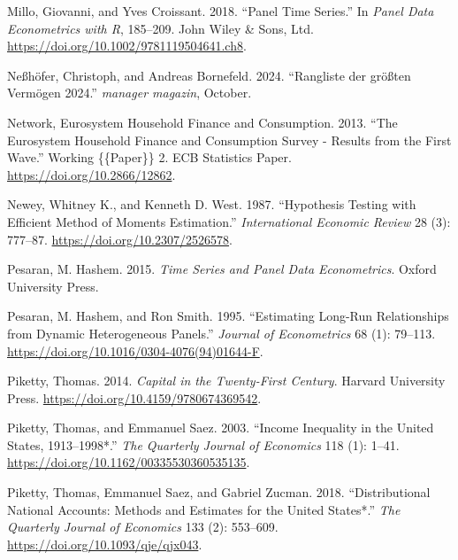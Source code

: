 \documentclass[
  a4paper,
  DIV=11,
  numbers=noendperiod]{scrartcl}
\newlength{\cslhangindent}
\newenvironment{CSLReferences}[2] %
 {\begin{list}{}{%
  \setlength{\itemindent}{0pt}
  \setlength{\leftmargin}{0pt}
  \setlength{\parsep}{0pt}
  \ifodd #1
   \setlength{\leftmargin}{\cslhangindent}
   \setlength{\itemindent}{-1\cslhangindent}
  \fi
  \setlength{\itemsep}{#2\baselineskip}}}
 {\end{list}}
\begin{document}
\begin{CSLReferences}{1}{0}
Millo, Giovanni, and Yves Croissant. 2018. {``Panel {Time Series}.''} In
\emph{Panel {Data Econometrics} with {R}}, 185--209. John Wiley \& Sons,
Ltd. \url{https://doi.org/10.1002/9781119504641.ch8}.

Neßhöfer, Christoph, and Andreas Bornefeld. 2024. {``{Rangliste der
gr{ö}{ß}ten Verm{ö}gen 2024}.''} \emph{manager magazin}, October.

Network, Eurosystem Household Finance and Consumption. 2013. {``The
{Eurosystem Household Finance} and {Consumption Survey} - {Results} from
the First Wave.''} Working \{\{Paper\}\} 2. ECB Statistics Paper.
\url{https://doi.org/10.2866/12862}.

Newey, Whitney K., and Kenneth D. West. 1987. {``Hypothesis {Testing}
with {Efficient Method} of {Moments Estimation}.''} \emph{International
Economic Review} 28 (3): 777--87. \url{https://doi.org/10.2307/2526578}.

Pesaran, M. Hashem. 2015. \emph{Time {Series} and {Panel Data
Econometrics}}. Oxford University Press.

Pesaran, M. Hashem, and Ron Smith. 1995. {``Estimating Long-Run
Relationships from Dynamic Heterogeneous Panels.''} \emph{Journal of
Econometrics} 68 (1): 79--113.
\url{https://doi.org/10.1016/0304-4076(94)01644-F}.

Piketty, Thomas. 2014. \emph{Capital in the {Twenty-First Century}}.
Harvard University Press. \url{https://doi.org/10.4159/9780674369542}.

Piketty, Thomas, and Emmanuel Saez. 2003. {``Income {Inequality} in the
{United States}, 1913--1998*.''} \emph{The Quarterly Journal of
Economics} 118 (1): 1--41.
\url{https://doi.org/10.1162/00335530360535135}.

Piketty, Thomas, Emmanuel Saez, and Gabriel Zucman. 2018.
{``Distributional {National Accounts}: {Methods} and {Estimates} for the
{United States}*.''} \emph{The Quarterly Journal of Economics} 133 (2):
553--609. \url{https://doi.org/10.1093/qje/qjx043}.


\end{CSLReferences}
\end{document}

